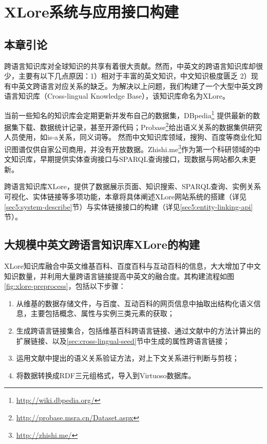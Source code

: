 \chapter{XLore系统与应用接口构建}
\label{cha:xlore}

\section{本章引论}

跨语言知识库对全球知识的共享有着很大贡献。然而，中英文的跨语言知识库却很少，主要有以下几点原因：1）相对于丰富的英文知识，中文知识极度匮乏 2）现有中英文跨语言对应关系的缺乏。为解决以上问题，我们构建了一个大型中英文跨语言知识库（Cross-lingual Knowledge Base），该知识库命名为{\heiti XLore}。

当前一些知名的知识库会定期更新并发布自己的数据集，DBpedia\footnote{\url{http://wiki.dbpedia.org/}} 提供最新的数据集下载、数据统计记录，甚至开源代码；Probase\footnote{\url{http://probase.msra.cn/Dataset.aspx}}给出语义关系的数据集供研究人员使用，如is-a关系，同义词等。
然而中文知识库领域，搜狗、百度等商业化知识图谱仅供自家公司商用，并没有开放数据。Zhishi.me\footnote{\url{http://zhishi.me/}}作为第一个科研领域的中文知识库，早期提供实体查询接口与SPARQL查询接口，现数据与网站都久未更新。

跨语言知识库XLore，提供了数据展示页面、知识搜索、SPARQL查询、实例关系可视化、实体链接等多项功能，本章将具体阐述XLore网站系统的搭建（详见\ref{sec5:system-describe}节）与实体链接接口的构建（详见\ref{sec5:entity-linking-api}节）。

\section{大规模中英文跨语言知识库XLore的构建}
\label{sec5:cross-lingual-knowledge-base}

XLore知识库融合中英文维基百科、百度百科与互动百科的信息，大大增加了中文知识数量，并利用大量跨语言链接提高中英文的融合度。其构建流程如图\ref{fig:xlore-preprocess}，包括以下步骤：
\begin{enumerate}
\item 从维基的数据存储文件，与百度、互动百科的网页信息中抽取出结构化语义信息，主要包括概念、属性与实例三类元素的获取；
\item 生成跨语言链接集合，包括维基百科跨语言链接、通过文献\cite{wang2012cross}中的方法计算出的扩展链接、以及\ref{sec:cross-lingual-seed}节中生成的属性跨语言链接；
\item 运用文献\cite{wang2014cross}中提出的语义关系验证方法，对上下文关系进行判断与剪枝；
\item 将数据转换成RDF三元组格式，导入到Virtuoso数据库。
\end{enumerate}

